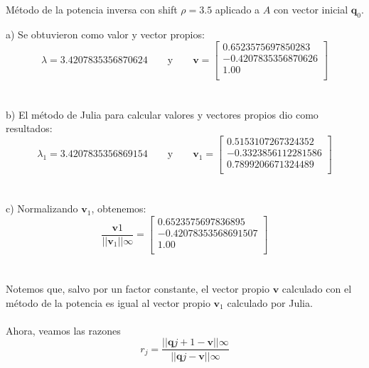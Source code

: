 \documentclass[11pt]{article}
\begin{document}
\noindent
Método de la potencia inversa con shift $\rho = 3.5$ aplicado a $A$ con vector inicial $\textbf{q}_0$.

a) Se obtuvieron como valor y vector propios:
 \[
 \lambda = 3.4207835356870624
 \qquad\text{y}\qquad
 \textbf{v} = \begin{bmatrix}
0.6523575697850283 \\
-0.4207835356870626\\
1.00 \\
\end{bmatrix}
 \]
 \\
 \\

b) El método de Julia para calcular valores y vectores propios dio como resultados:
\[
 \lambda_1 = 3.4207835356869154
 \qquad\text{y}\qquad
 \textbf{v}_1 = \begin{bmatrix}
0.5153107267324352 \\
-0.3323856112281586 \\
0.7899206671324489 \\
\end{bmatrix}
 \]
 \\
 \\

 c) Normalizando $\textbf{v}_1$, obtenemos:
 $$\frac{\textbf{v}1}{||\textbf{v}_1||\infty} =
\begin{bmatrix}
0.6523575697836895 \\
-0.42078353568691507 \\
1.00 \\
\end{bmatrix}$$
\\
\\

Notemos que, salvo por un factor constante, el vector propio $\textbf{v}$ calculado con el método de la potencia es igual al vector propio $\textbf{v}_1$ calculado por Julia.
\\
\\

Ahora, veamos las razones
$$
r_j = \frac{||\textbf{q}{j+1} - \textbf{v}||\infty}{||\textbf{q}{j} - \textbf{v}||\infty}
$$
\\
\end{document}
